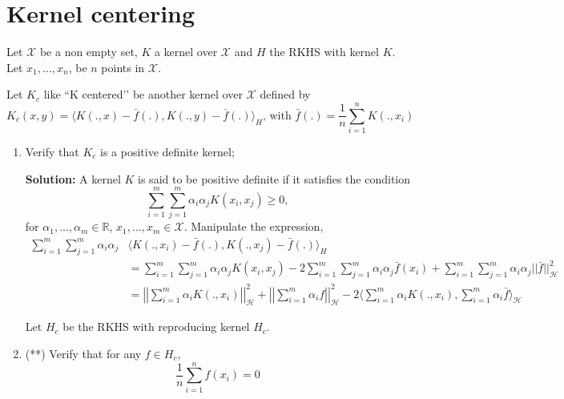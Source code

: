 \documentclass{article}[12pt]
\begin{document}
\section{Kernel centering}
Let $\mathcal{X}$ be a non empty set, $K$ a kernel over $\mathcal{X}$ and $H$ the RKHS with kernel $K$. Let $x_1,\ldots,x_n$, be $n$ points in $\mathcal{X}$. 

Let $K_c$ like ``K centered\rq\rq{} be another kernel over $\mathcal{X}$ defined by 
\begin{equation}
K_c(x,y)=\langle K(.,x)- \bar{f}(.), K(.,y)-\bar{f}(.)\rangle_H \mbox{, with } \bar{f}(.)=\frac{1}{n}\sum_{i=1}^n K(.,x_i)
\end{equation}
\begin{enumerate}
\item Verify that $K_c$ is a positive definite kernel;

	\textbf{Solution:} A kernel $K$ is said to be positive definite if it satisfies the condition \begin{equation}
		\sum^{m}_{i=1} \sum^{m}_{j=1} \alpha_i \alpha_j K(x_i, x_j) \ge 0,  		
\end{equation}
for $\alpha_1,...,\alpha_m \in \mathbb R$, $x_1,...,x_m \in \mathcal X$. Manipulate the expression, 
\begin{equation}
	\begin{aligned}
		\sum^{m}_{i=1} \sum^{m}_{j=1} \alpha_i \alpha_j  &\langle K(.,x_i)- \bar{f}(.), K(.,x_j)-\bar{f}(.)\rangle_H \\ 
		&= \sum^{m}_{i=1} \sum^{m}_{j=1} \alpha_i \alpha_j K(x_i, x_j) - 2 \sum^{m}_{i=1} \sum^{m}_{j=1} \alpha_i \alpha_j \bar f(x_i)  + \sum^{m}_{i=1} \sum^{m}_{j=1} \alpha_i \alpha_j || \bar f ||_{\mathcal H}^2 \\
		&= \left| \left| \sum^{m}_{i=1} \alpha_i K(., x_i)  \right| \right|^2_{\mathcal H} + \left| \left| \sum^{m}_{i=1} \alpha_i f  \right| \right|^2_{\mathcal H} - 2 \langle \sum^{m}_{i=1} \alpha_i K(., x_i), \sum^{m}_{i=1} \alpha_i \bar f  \rangle_{\mathcal H}  
	\end{aligned}
\end{equation}

	
Let $H_c$ be the RKHS with reproducing kernel $H_c$. 
\item (**) Verify that for any $f \in H_c$, 
\begin{equation}
\frac{1}{n} \sum_{i=1}^n f(x_i)=0
\end{equation}


\end{enumerate}
\end{document}
